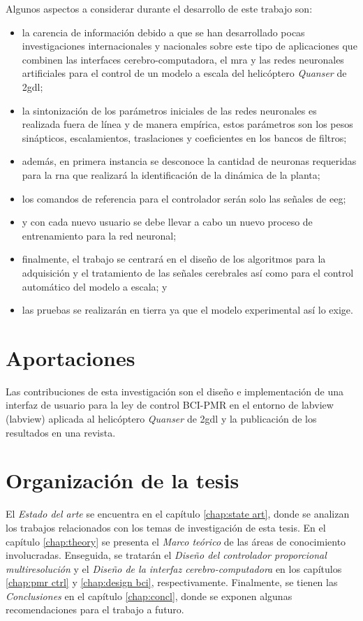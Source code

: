     Algunos aspectos a considerar durante el desarrollo de este trabajo son:
    \begin{itemize}[noitemsep, nolistsep, leftmargin = 15mm]
        \item la carencia de información debido a que se han desarrollado pocas investigaciones internacionales y nacionales sobre este tipo de aplicaciones que combinen las interfaces cerebro-computadora, el \acrlong{mra} y las redes neuronales artificiales para el control de un modelo a escala del helicóptero \textit{Quanser} de \acrshort{2gdl};
        \item la sintonización de los parámetros iniciales de las redes neuronales es realizada fuera de línea y de manera empírica, estos parámetros son los pesos sinápticos, escalamientos, traslaciones y coeficientes en los bancos de filtros;
        \item además, en primera instancia se desconoce la cantidad de neuronas requeridas para la \acrlong{rna} que realizará la identificación de la dinámica de la planta;
        \item los comandos de referencia para el controlador serán solo las señales de \acrlong{eeg};
        \item y con cada nuevo usuario se debe llevar a cabo un nuevo proceso de entrenamiento para la red neuronal;
        \item finalmente, el trabajo se centrará en el diseño de los algoritmos para la adquisición y el tratamiento de las señales cerebrales así como para el control automático del modelo a escala; y
        \item las pruebas se realizarán en tierra ya que el modelo experimental así lo exige.
    \end{itemize}
    
\section{Aportaciones}

    Las contribuciones de esta investigación son el diseño e implementación de una interfaz de usuario para la ley de control BCI-PMR en el entorno de \acrlong{labview} (\acrshort{labview}\textregistered) aplicada al helicóptero \textit{Quanser} de \acrshort{2gdl} y la publicación de los resultados en una revista.

\section{Organización de la tesis}

    El \textit{Estado del arte} se encuentra en el capítulo \ref{chap:state art}, donde se analizan los trabajos relacionados con los temas de investigación de esta tesis. En el capítulo \ref{chap:theory} se presenta el \textit{Marco teórico} de las áreas de conocimiento involucradas. Enseguida, se tratarán el \textit{Diseño del controlador proporcional multiresolución} y el \textit{Diseño de la interfaz cerebro-computadora} en los capítulos \ref{chap:pmr ctrl} y \ref{chap:design bci}, respectivamente. Finalmente, se tienen las \textit{Conclusiones} en el capítulo \ref{chap:concl}, donde se exponen algunas recomendaciones para el trabajo a futuro.